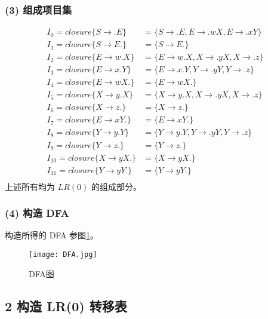 \documentclass[UTF8]{ctexart}
\begin{document}
        \subsubsection*{(3) 组成项目集}
            \begin{align*}
                I_0 = closure\{S\to .E\} &= \{S\to .E, E\to .wX, E\to .xY\} \\
                I_1 = closure\{S\to E.\} &= \{S\to E.\} \\
                I_2 = closure\{E\to w.X\} &= \{E\to w.X, X\to .yX, X\to .z\} \\
                I_3 = closure\{E\to x.Y\} &= \{E\to x.Y, Y\to .yY, Y\to .z\} \\
                I_4 = closure\{E\to wX.\} &= \{E\to wX.\} \\
                I_5 = closure\{X\to y.X\} &= \{X\to y.X, X\to .yX, X\to .z\} \\
                I_6 = closure\{X\to z.\} &= \{X\to z.\} \\
                I_7 = closure\{E\to xY.\} &= \{E\to xY.\} \\
                I_{8} = closure\{Y\to y.Y\} &= \{Y\to y.Y, Y\to .yY, Y\to .z\} \\
                I_{9} = closure\{Y\to z.\} &= \{Y\to z.\} \\
                I_{10} = closure\{X\to yX.\} &= \{X\to yX.\} \\
                I_{11} = closure\{Y\to yY.\} &= \{Y\to yY.\} \\
            \end{align*}
            上述所有均为 $LR(0)$ 的组成部分。

        \subsubsection*{(4) 构造 DFA}
            构造所得的 DFA 参图\ref{dfa}。
            \begin{figure}[htbp!]
                \centering
                \texttt{[image: DFA.jpg]}
                \caption{DFA图}
                \label{dfa}
            \end{figure}

    \subsection*{2 构造 LR(0) 转移表}
\end{document}
